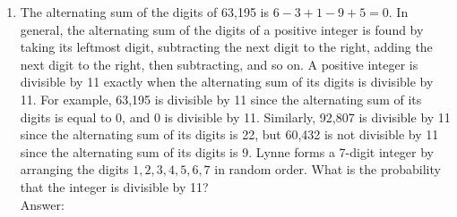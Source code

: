 \documentclass[12pt]{extarticle}
\begin{document}
\begin{enumerate}
    \item {The alternating sum of the digits of 63,195 is $6-3+1-9+5=0$. In general, the alternating sum of the digits of a positive integer is found by taking its leftmost digit, subtracting the next digit to the right, adding the next digit to the right, then subtracting, and so on. A positive integer is divisible by 11 exactly when the alternating sum of its digits is divisible by 11. For example, 63,195 is divisible by 11 since the alternating sum of its digits is equal to 0, and 0 is divisible by 11. Similarly, 92,807 is divisible by 11 since the alternating sum of its digits is 22, but 60,432 is not divisible by 11 since the alternating sum of its digits is 9. Lynne forms a 7-digit integer by arranging the digits $1,2,3,4,5,6,7$ in random order. What is the probability that the integer is divisible by 11? \\Answer: }
\end{enumerate}
\end{document}
